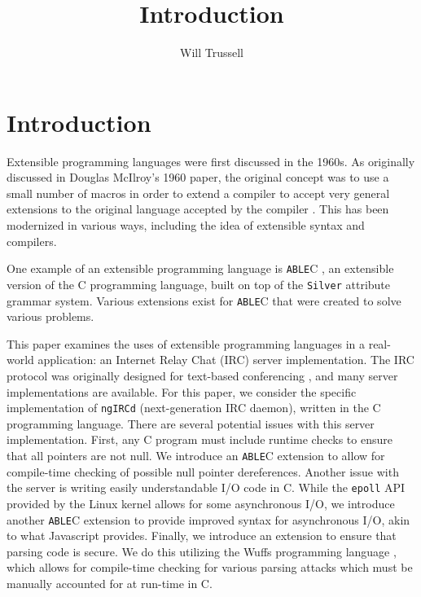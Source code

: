 \documentclass[main.tex]{subfiles}
\author{Will Trussell}
\title{Introduction}
\begin{document}
\section{Introduction}

Extensible programming languages were first discussed in the 1960s. As
originally discussed in Douglas McIlroy's 1960 paper, the original concept was
to use a small number of macros in order to extend a compiler to accept very
general extensions to the original language accepted by the compiler 
\cite{5}. This has been modernized in various ways, including the idea
of extensible syntax and compilers.

One example of an extensible programming language is \verb|ABLE|C \cite{7}, 
an extensible version of the C programming language, built on top of the 
\verb|Silver| \cite{2} attribute grammar system. Various extensions exist for 
\verb|ABLE|C that were created to solve various problems. 

This paper examines the uses of extensible programming languages in a real-world
application: an Internet Relay Chat (IRC) server implementation. The IRC
protocol was originally designed for text-based conferencing \cite{6}, and
many server implementations are available. For this paper, we consider the
specific implementation of \verb|ngIRCd| (next-generation IRC daemon), written 
in the C programming language. There are several potential issues with this 
server implementation. First, any C program must include runtime checks to 
ensure that all pointers are not null. We introduce an \verb|ABLE|C extension to 
allow for compile-time checking of possible null pointer dereferences.  Another 
issue with the server is writing easily understandable I/O code in C. While the 
\verb|epoll| API provided by the Linux kernel allows for some asynchronous I/O, 
we introduce another \verb|ABLE|C extension to provide improved syntax for 
asynchronous I/O, akin to what Javascript provides. Finally, we introduce an 
extension to ensure that parsing code is secure. We do this utilizing the Wuffs 
programming language \cite{4}, which allows for compile-time checking for various 
parsing attacks which must be manually accounted for at run-time in C.
\end{document}
